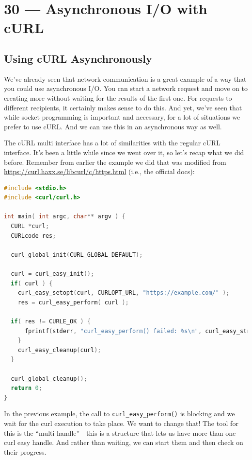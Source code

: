 \documentclass[a4paper]{report}
\begin{document}
\chapter*{30 --- Asynchronous I/O with cURL}


\section*{Using cURL Asynchronously}
We've already seen that network communication is a great example of a way that you could use asynchronous  I/O. You can start a network request and move on to creating more without waiting for the results of the first one. For requests to different recipients, it certainly makes sense to do this. And yet, we've seen that while socket programming is important and necessary, for a lot of situations we prefer to use cURL. And we can use this in an asynchronous way as well.

The cURL multi interface has a lot of similarities with the regular cURL interface. It's been a little while since we went over it, so let's recap what we did before. Remember from earlier the example we did that was modified from \url{https://curl.haxx.se/libcurl/c/https.html} (i.e., the official docs):

\begin{lstlisting}[language=C]
#include <stdio.h>
#include <curl/curl.h>
 
int main( int argc, char** argv ) {
  CURL *curl;
  CURLcode res;
 
  curl_global_init(CURL_GLOBAL_DEFAULT);
 
  curl = curl_easy_init();
  if( curl ) {
    curl_easy_setopt(curl, CURLOPT_URL, "https://example.com/" );
    res = curl_easy_perform( curl );
    
  if( res != CURLE_OK ) {
      fprintf(stderr, "curl_easy_perform() failed: %s\n", curl_easy_strerror(res));
    }
    curl_easy_cleanup(curl);
  }
 
  curl_global_cleanup();
  return 0;
}
\end{lstlisting}

In the previous example, the call to \texttt{curl\_easy\_perform()} is blocking and we wait for the curl execution to take place. We want to change that! The tool for this is the ``multi handle'' - this is a structure that lets us have more than one curl easy handle. And rather than waiting, we can start them and then check on their progress.
\end{document}
